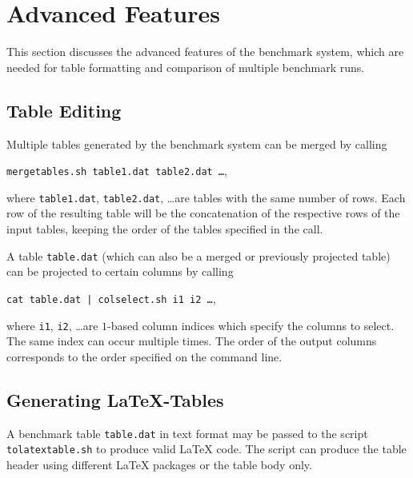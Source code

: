 \documentclass[a4paper]{article}
\begin{document}
	\section{Advanced Features}
	\label{sec:advanced}

		This section discusses the advanced features of the benchmark system,
		which are needed for table formatting and comparison of multiple benchmark runs.

		\subsection{Table Editing}

			Multiple tables generated by the benchmark system can be merged by calling
			\begin{center}
				{\tt mergetables.sh table1.dat table2.dat \ldots},
			\end{center}
			where {\tt table1.dat}, {\tt table2.dat}, \ldots are tables
			with the same number of rows. Each row of the resulting table will be the
			concatenation of the respective rows of the input tables, keeping the order of the tables
			specified in the call.

			A table {\tt table.dat} (which can also be a merged or previously projected table) can be projected
			to certain columns by calling
			\begin{center}
				{\tt cat table.dat | colselect.sh i1 i2 \ldots},
			\end{center}
			where {\tt i1}, {\tt i2}, \ldots are $1$-based column indices
			which specify the columns to select. The same index can occur multiple times.
			The order of the output columns corresponds to the order specified on the command line.

		\subsection{Generating \LaTeX-Tables}

			A benchmark table {\tt table.dat} in text format
			may be passed to the script {\tt tolatextable.sh} to produce valid \LaTeX{} code.
			The script can produce the table header using different \LaTeX{} packages or the table body only.
\end{document}
